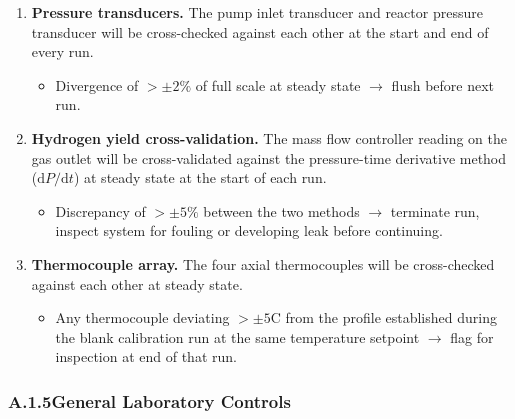\documentclass[12pt]{article}
\begin{document}
\begin{enumerate}[label=\textbf{\arabic*.}, leftmargin=*, itemsep=6pt]

    \item \textbf{Pressure transducers.}
    The pump inlet transducer and reactor pressure transducer will be cross-checked
    against each other at the start and end of every run.
    \begin{itemize}[itemsep=2pt]
        \item Divergence of $>{\pm}2\%$ of full scale at steady state $\rightarrow$
              flush before next run.
    \end{itemize}

    \item \textbf{Hydrogen yield cross-validation.}
    The mass flow controller reading on the gas outlet will be cross-validated
    against the pressure-time derivative method ($\mathrm{d}P/\mathrm{d}t$) at
    steady state at the start of each run.
    \begin{itemize}[itemsep=2pt]
        \item Discrepancy of $>{\pm}5\%$ between the two methods $\rightarrow$
              terminate run, inspect system for fouling or developing leak before
              continuing.
    \end{itemize}

    \item \textbf{Thermocouple array.}
    The four axial thermocouples will be cross-checked against each other at steady
    state.
    \begin{itemize}[itemsep=2pt]
        \item Any thermocouple deviating $>{\pm}5$\textdegree C from the profile
              established during the blank calibration run at the same temperature
              setpoint $\rightarrow$ flag for inspection at end of that run.
    \end{itemize}

\end{enumerate}

\subsubsection*{A.1.5\quad General Laboratory Controls}
\end{document}
